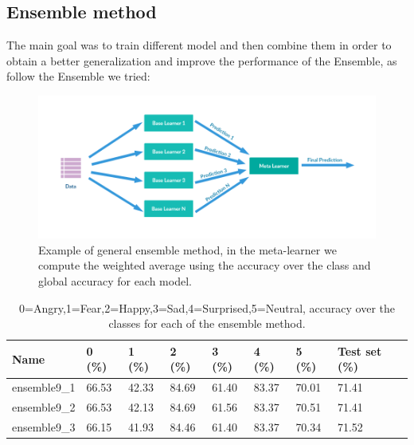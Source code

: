 \documentclass[10pt,twocolumn,letterpaper]{article}
\begin{document}
\subsection*{Ensemble method}
The main goal was to train different model and then combine them in order to obtain a better generalization and improve the performance of the Ensemble, as follow the Ensemble we tried:\\
\begin{figure}[H]
   \centering
   \includegraphics[width=1\linewidth]{./immagini/ensemble.png}
   \caption{Example of general ensemble method, in the meta-learner we compute the weighted average using the accuracy over the class and global accuracy for each model.}
\end{figure}
\def\arraystretch{1.2}
\begin{table}[H]
   \scriptsize
   \begin{tabular}{L{1.1cm}C{0.5cm}C{0.5cm}C{0.5cm}C{0.5cm}C{0.5cm}C{0.5cm}C{0.8cm}}
      \hline
      Name         & 0 (\%) & 1 (\%) & 2 (\%) & 3 (\%) & 4 (\%) & 5 (\%) & Test set (\%) \\
      \hline\hline
      ensemble9\_1 & 66.53  & 42.33  & 84.69  & 61.40  & 83.37  & 70.01  & 71.41         \\
      ensemble9\_2 & 66.53  & 42.13  & 84.69  & 61.56  & 83.37  & 70.51  & 71.41         \\
      ensemble9\_3 & 66.15  & 41.93  & 84.46  & 61.40  & 83.37  & 70.34  & 71.52         \\

      \hline
   \end{tabular}
   \caption{ 0=Angry,1=Fear,2=Happy,3=Sad,4=Surprised,5=Neutral, accuracy over the classes for each of the ensemble method.}
   \label{table:accuracymodelli}
\end{table}
\end{document}
